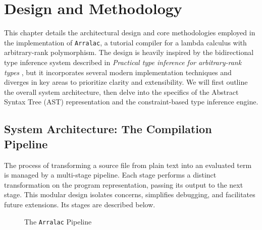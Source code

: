 \chapter{Design and Methodology}
\label{chap:DesignAndMethodology}

This chapter details the architectural design and core methodologies employed in the implementation of \texttt{Arralac}, a tutorial compiler for a lambda calculus with arbitrary-rank polymorphism. The design is heavily inspired by the bidirectional type inference system described in \textit{Practical type inference for arbitrary-rank types} \cite{jones-practical-2007}, but it incorporates several modern implementation techniques and diverges in key areas to prioritize clarity and extensibility. We will first outline the overall system architecture, then delve into the specifics of the Abstract Syntax Tree (AST) representation and the constraint-based type inference engine.

\section{System Architecture: The Compilation Pipeline}
\label{sec:Design:Pipeline}

The process of transforming a source file from plain text into an evaluated term is managed by a multi-stage pipeline. Each stage performs a distinct transformation on the program representation, passing its output to the next stage. This modular design isolates concerns, simplifies debugging, and facilitates future extensions. Its stages are described below.

\begin{figure}[h!]
    \centering
    \caption{The \texttt{Arralac} Pipeline}
    \label{fig:pipeline}
\end{figure}


